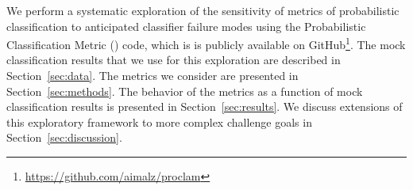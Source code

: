 We perform a systematic exploration of the sensitivity of metrics of probabilistic classification to anticipated classifier failure modes using the Probabilistic Classification Metric (\proclam) code, which is is publicly available on GitHub\footnote{\url{https://github.com/aimalz/proclam}}.
The mock classification results that we use for this exploration are described in Section~\ref{sec:data}.
The metrics we consider are presented in Section~\ref{sec:methods}.
The behavior of the metrics as a function of mock classification results is presented in Section~\ref{sec:results}.
We discuss extensions of this exploratory framework to more complex challenge goals in Section~\ref{sec:discussion}.
